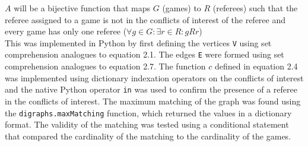 \documentclass{template/custombook}
\newcommand{\python}{\texttt}
\begin{document}
        $A$ will be a bijective function that maps $G$ (games) to $R$ (referees) such that the referee assigned to a game is not in the conflicts of interest of the referee and every game has only one referee ($\forall g \in G : \exists r \in R: gRr$) \cite{jenner2022mxb102}\\
        This was implemented in Python by first defining the vertices \python{V} using set comprehension analogues to equation 2.1. The edges \python{E} were formed using set comprehension analogues to equation 2.7. The function $c$ defined in equation 2.4 was implemented using dictionary indexation operators on the conflicts of interest and the native Python operator \python{in} was used to confirm the presence of a referee in the conflicts of interest. The maximum matching of the graph was found using the \python{digraphs.maxMatching} function, which returned the values in a dictionary format. The validity of the matching was tested using a conditional statement that compared the cardinality of the matching to the cardinality of the games.
\end{document}
